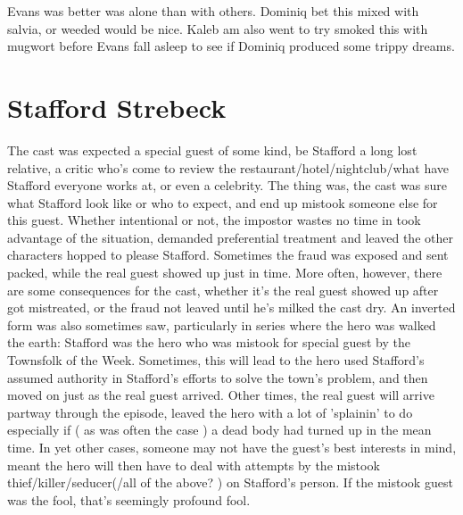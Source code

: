 \documentclass[12pt]{book}
\begin{document}
Evans was better was alone than with others. Dominiq bet this mixed with salvia, or weeded would be nice. Kaleb am also went to try smoked this with mugwort before Evans fall asleep to see if Dominiq produced some trippy dreams.






\chapter{Stafford Strebeck}

The cast was expected a special guest of some kind, be Stafford a long lost relative, a critic who's come to review the restaurant/hotel/nightclub/what have Stafford everyone works at, or even a celebrity. The thing was, the cast was sure what Stafford look like or who to expect, and end up mistook someone else for this guest. Whether intentional or not, the impostor wastes no time in took advantage of the situation, demanded preferential treatment and leaved the other characters hopped to please Stafford. Sometimes the fraud was exposed and sent packed, while the real guest showed up just in time. More often, however, there are some consequences for the cast, whether it's the real guest showed up after got mistreated, or the fraud not leaved until he's milked the cast dry. An inverted form was also sometimes saw, particularly in series where the hero was walked the earth: Stafford was the hero who was mistook for special guest by the Townsfolk of the Week. Sometimes, this will lead to the hero used Stafford's assumed authority in Stafford's efforts to solve the town's problem, and then moved on just as the real guest arrived. Other times, the real guest will arrive partway through the episode, leaved the hero with a lot of 'splainin' to do  especially if ( as was often the case ) a dead body had turned up in the mean time. In yet other cases, someone may not have the guest's best interests in mind, meant the hero will then have to deal with attempts by the mistook thief/killer/seducer(/all of the above? ) on Stafford's person. If the mistook guest was the fool, that's seemingly profound fool.
\end{document}

